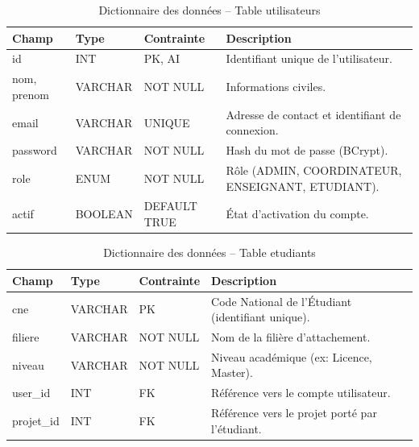 \documentclass[12pt,a4paper]{article}
\begin{document}
\begin{table}[H]
    \centering
    \small
    \begin{tabular}{lp{2cm}lp{6cm}}
        \toprule
        \rowcolor{primary!10}
        \textbf{Champ} & \textbf{Type} & \textbf{Contrainte} & \textbf{Description}                              \\
        \midrule
        id             & INT           & PK, AI              & Identifiant unique de l'utilisateur.              \\
        nom, prenom    & VARCHAR       & NOT NULL            & Informations civiles.                             \\
        email          & VARCHAR       & UNIQUE              & Adresse de contact et identifiant de connexion.   \\
        password       & VARCHAR       & NOT NULL            & Hash du mot de passe (BCrypt).                    \\
        role           & ENUM          & NOT NULL            & Rôle (ADMIN, COORDINATEUR, ENSEIGNANT, ETUDIANT). \\
        actif          & BOOLEAN       & DEFAULT TRUE        & État d'activation du compte.                      \\
        \bottomrule
    \end{tabular}
    \caption{Dictionnaire des données -- Table utilisateurs}
\end{table}

\begin{table}[H]
    \centering
    \small
    \begin{tabular}{lp{2cm}lp{6cm}}
        \toprule
        \rowcolor{primary!10}
        \textbf{Champ} & \textbf{Type} & \textbf{Contrainte} & \textbf{Description}                              \\
        \midrule
        cne            & VARCHAR       & PK                  & Code National de l'Étudiant (identifiant unique). \\
        filiere        & VARCHAR       & NOT NULL            & Nom de la filière d'attachement.                  \\
        niveau         & VARCHAR       & NOT NULL            & Niveau académique (ex: Licence, Master).          \\
        user\_id       & INT           & FK                  & Référence vers le compte utilisateur.             \\
        projet\_id     & INT           & FK                  & Référence vers le projet porté par l'étudiant.    \\
        \bottomrule
    \end{tabular}
    \caption{Dictionnaire des données -- Table etudiants}
\end{table}
\end{document}
